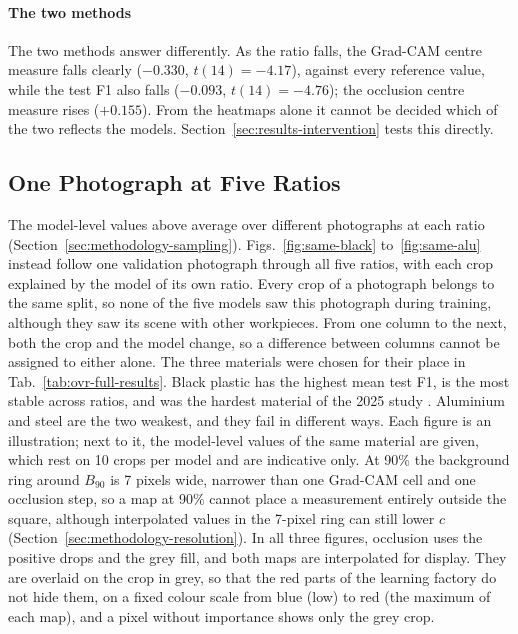 \paragraph{The two methods}
The two methods answer differently. As the ratio falls, the Grad-CAM centre measure
falls clearly ($-0.330$, $t(14) = -4.17$), against every reference value, while the test
F1 also falls ($-0.093$, $t(14) = -4.76$); the occlusion centre measure rises
($+0.155$). From the heatmaps alone it cannot be decided which of the two reflects the
models. Section~\ref{sec:results-intervention} tests this directly.

\subsection{One Photograph at Five Ratios}
\label{sec:results-qualitative}

The model-level values above average over different photographs at each ratio
(Section~\ref{sec:methodology-sampling}). Figs.~\ref{fig:same-black}
to~\ref{fig:same-alu} instead follow one validation photograph through all five
ratios, with each crop explained by the model of its own ratio. Every crop of a
photograph belongs to the same split, so none of the five models saw this photograph
during training, although they saw its scene with other workpieces. From one column to the next, both the crop and the model change, so a
difference between columns cannot be assigned to either alone. The three
materials were chosen for their place in Tab.~\ref{tab:ovr-full-results}. Black plastic
has the highest mean test F1, is the most stable across ratios, and was the hardest material of the 2025
study \citep{schneidereitYOLOv8}. Aluminium and steel are the two weakest, and they fail
in different ways. Each figure is an illustration; next to it, the model-level values
of the same material are given, which rest on 10 crops per model and are indicative
only. At 90\% the background ring around $B_{90}$ is 7 pixels wide, narrower
than one Grad-CAM cell and one occlusion step, so a map at 90\% cannot place a measurement
entirely outside the square, although interpolated values in the 7-pixel ring can still
lower $c$ (Section~\ref{sec:methodology-resolution}). In all three
figures, occlusion uses the positive drops and the grey fill, and both maps are
interpolated for display. They are overlaid on the crop in grey, so that the red parts
of the learning factory do not hide them, on a fixed colour scale from blue (low) to red
(the maximum of each map), and a pixel without importance shows only the grey crop.
